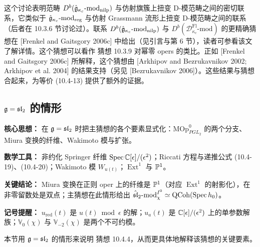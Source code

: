这个讨论表明范畴 $D^b(\hat{\mathfrak{g}}_{\kappa_c}\text{-}\mathrm{mod}_{\mathrm{nilp}})$ 与仿射旗簇上扭变 D-模范畴之间的密切联系，它类似于 $\hat{\mathfrak{g}}_{\kappa_c}\text{-}\mathrm{mod}_{\mathrm{reg}}$ 与仿射 Grassmann 流形上扭变 D-模范畴之间的联系（后者在 10.3.6 节讨论过）。联系 $D^b(\hat{\mathfrak{g}}_{\kappa_c}\text{-}\mathrm{mod}_{\mathrm{nilp}})$ 与 $D^b(\mathcal{D}^{\mathrm{Fl}}_{\kappa_c}\text{-}\mathrm{mod})$ 的更精确猜想在 [Frenkel and Gaitsgory 2006c] 中给出（见引言与第 6 节），读者可参看该文了解详情。这个猜想可以看作 猜想 10.3.9 对幂零 opers 的类比。正如 [Frenkel and Gaitsgory 2006c] 所解释，这个猜想由 [Arkhipov and Bezrukavnikov 2002; Arkhipov et al. 2004] 的结果支持（另见 [Bezrukavnikov 2006]）。这些结果与猜想合起来，为等价 (10.4-13) 提供了额外的证据。

\subsection{\texorpdfstring{$\mathfrak{g}=\mathfrak{sl}_2$}{g=sl2} 的情形}

\begin{keypoints}
    \item \textbf{核心思想：} 在 $\mathfrak{g}=\mathfrak{sl}_2$ 时把主猜想的各个要素显式化：$\mathrm{MOp}^0_{PGL_2}$ 的两个分支、Miura 变换的纤维、Wakimoto 模与扩张。
    \item \textbf{数学工具：} 非约化 Springer 纤维 $\operatorname{Spec}\mathbb{C}[\epsilon]/(\epsilon^2)$；Riccati 方程与递推公式 (10.4-19)、(10.4-20)；Wakimoto 模 $W_{u(t)}$；$\operatorname{Ext}^1$ 与 $\mathbb{P}^1$。
    \item \textbf{关键结论：} Miura 变换在正则 oper 上的纤维是 $\mathbb{P}^1$（对应 $\operatorname{Ext}^1$ 的射影化），在非零留数处是双点；主猜想在此情形给出 $\hat{\mathfrak{sl}}_2\text{-}\mathrm{mod}_\chi^{I^0}\simeq\mathrm{QCoh}(\operatorname{Spec} h_0)$。
    \item \textbf{记号提醒：} $u_{\mathrm{red}}(t)$ 是 $u(t)\bmod\epsilon$ 的解；$u_a(t)$ 是 $\mathbb{C}[\epsilon]/(\epsilon^2)$ 上的单参数解族；$\mathbb{V}_0(\chi)$ 与 $\mathbb{V}_{-2}(\chi)$ 是两个不可约模。
\end{keypoints}

本节用 $\mathfrak{g}=\mathfrak{sl}_2$ 的情形来说明 猜想 10.4.4，从而更具体地解释该猜想的关键要素。

